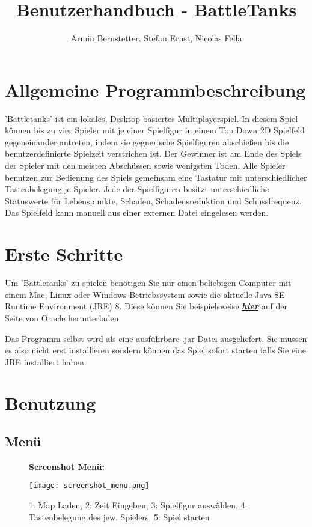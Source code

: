 \documentclass[a4paper]{article}
\title{Benutzerhandbuch - BattleTanks}
\author{Armin Bernstetter, Stefan Ernst, Nicolas Fella}
\begin{document}
\maketitle
\tableofcontents
\newpage

\section{Allgemeine Programmbeschreibung}
'Battletanks' ist ein lokales, Desktop-basiertes Multiplayerspiel. In diesem Spiel
können bis zu vier Spieler mit je einer Spielfigur in einem Top Down 2D Spielfeld gegeneinander antreten, indem sie gegnerische Spielfiguren abschießen bis die benutzerdefinierte Spielzeit verstrichen ist. Der Gewinner ist am Ende des Spiels der Spieler mit den meisten Abschüssen sowie wenigsten Toden.
Alle Spieler benutzen zur Bedienung des Spiels gemeinsam eine Tastatur mit unterschiedlicher Tastenbelegung je Spieler. Jede der Spielfiguren besitzt unterschiedliche Statuswerte für Lebenspunkte, Schaden, Schadensreduktion und Schussfrequenz.
Das Spielfeld kann manuell aus einer externen Datei eingelesen werden.



\section{Erste Schritte}
Um 'Battletanks' zu spielen benötigen Sie nur einen beliebigen Computer mit einem Mac, Linux oder Windows-Betriebssystem sowie die aktuelle Java SE Runtime Environment (JRE) 8. Diese können Sie beispielsweise \href{http://www.oracle.com/technetwork/java/javase/downloads/jre8-downloads-2133155.html}{\textbf{\textit{hier}}} auf der Seite von Oracle herunterladen.

Das Programm selbst wird als eine ausführbare .jar-Datei ausgeliefert, Sie müssen es also nicht erst installieren sondern können das Spiel sofort starten falls Sie eine JRE installiert haben.

\newpage
\section{Benutzung}
\subsection{Menü}

\begin{figure}[H]
  \textbf{Screenshot Menü:}\par\medskip
  \centering
\texttt{[image: screenshot\_menu.png]}
\caption{1: Map Laden, 2: Zeit Eingeben, 3: Spielfigur auswählen, 4: Tastenbelegung des jew. Spielers,
5: Spiel starten}
\end{figure}
\end{document}
